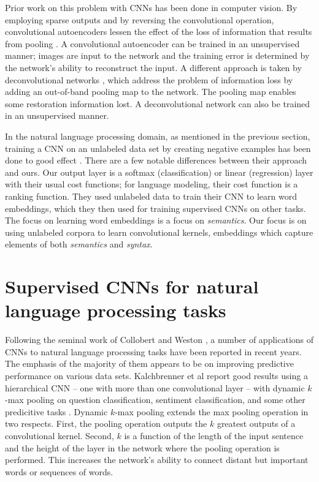 Prior work on this problem with CNNs has been done in computer vision.
By employing sparse outputs and by reversing the convolutional
operation, convolutional autoencoders lessen the effect of the
loss of information that results from pooling \cite{Masci2011-hh}.
A convolutional autoencoder can be trained in an unsupervised manner;
images are input to the network and the training error is determined by
the network's ability to reconstruct the input.  A different approach
is taken by deconvolutional networks \cite{Zeiler2010-gf}, which address
the problem of information loss by adding an out-of-band pooling map to
the network.  The pooling map enables some restoration information lost.
A deconvolutional network can also be trained in an unsupervised manner.

In the natural language processing domain, as mentioned in the previous
section, training a CNN on an unlabeled data set by creating negative
examples has been done to good effect \cite{Collobert2008-su}.  There are
a few notable differences between their approach and ours.  Our output
layer is a softmax (classification) or linear (regression) layer with
their usual cost functions; for language modeling, their cost function
is a ranking function.  They used unlabeled data to train their CNN
to learn word embeddings, which they then used for training supervised
CNNs on other tasks.  The focus on learning word embeddings is a focus
on \textit{semantics}.  Our focus is on using unlabeled corpora to
learn convolutional kernels, embeddings which capture elements of both
\textit{semantics} and \textit{syntax}.

\section{Supervised CNNs for natural language processing tasks}

Following the seminal work of Collobert and Weston
\cite{Collobert2008-su}, a number of applications of CNNs to natural
language processing tasks have been reported in recent years.  The
emphasis of the majority of them appears to be on improving predictive
performance on various data sets.  Kalchbrenner et al report good results
using a hierarchical CNN -- one with more than one convolutional layer
-- with dynamic $k$-max pooling on question classification, sentiment
classification, and some other predicitive tasks \cite{Kalchbrenner2014-tl}.
Dynamic $k$-max pooling extends the max pooling operation in two respects.
First, the pooling operation outputs the $k$ greatest outputs of a
convolutional kernel.  Second, $k$ is a function of the length of the
input sentence and the height of the layer in the network where the
pooling operation is performed.  This increases the network's ability to
connect distant but important words or sequences of words.

